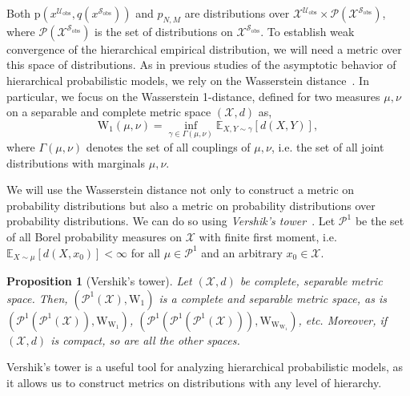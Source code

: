 \documentclass[12pt]{article}
\newtheorem{proposition}{Proposition}
\newcommand{\Sc}{\mathcal{S}}
\newcommand{\Uc}{\mathcal{U}}
\newcommand{\pr}{\mathrm{p}}
\newcommand{\obs}{\mathrm{obs}}
\newcommand{\Was}{\mathrm{W}}
\begin{document}
Both $\pr(x^{\Uc_\obs}, q(x^{\Sc_\obs}))$ and $p_{N,M}$ are distributions over $\mathcal{X}^{\Uc_\obs} \times \mathcal{P}(\mathcal{X}^{\Sc_\obs})$, where $\mathcal{P}(\mathcal{X}^{\Sc_\obs})$ is the set of distributions on $\mathcal{X}^{\Sc_\obs}$.
To establish weak convergence of the hierarchical empirical distribution, we will need a metric over this space of distributions.
As in previous studies of the asymptotic behavior of hierarchical probabilistic models, we rely on the Wasserstein distance~\citep{Nguyen2013-tv}.
In particular, we focus on the Wasserstein 1-distance, defined for two measures $\mu,\nu$ on a separable and complete metric space $(\mathcal{X},d)$ as,
\begin{equation*}
	\Was_{1}(\mu,\nu) = \inf_{\gamma \in \Gamma(\mu,\nu)} \mathbb{E}_{X, Y \sim \gamma}[d(X,Y)],
\end{equation*}
where $\Gamma(\mu,\nu)$ denotes the set of all couplings of $\mu,\nu$, i.e. the set of all joint distributions with marginals $\mu,\nu$.

We will use the Wasserstein distance not only to construct a metric on probability distributions but also a metric on probability distributions over probability distributions.
We can do so using \textit{Vershik's tower}~\citep[Chap. 1.1]{Bogachev2012-dz}. Let $\mathcal{P}^1$ be the set of all Borel probability measures on $\mathcal{X}$ with finite first moment, i.e. $\mathbb{E}_{X \sim \mu}[d(X, x_0)] < \infty$ for all $\mu \in \mathcal{P}^1$ and an arbitrary $x_0 \in \mathcal{X}$. 
\begin{proposition}[Vershik's tower]
	Let $(\mathcal{X}, d)$ be complete, separable metric space. Then, $(\mathcal{P}^1(\mathcal{X}), \Was_{1})$ is a complete and separable metric space, as is $(\mathcal{P}^1(\mathcal{P}^1(\mathcal{X})), \Was_{\Was_{1}})$,
	$(\mathcal{P}^1(\mathcal{P}^1(\mathcal{P}^1(\mathcal{X}))), \Was_{\Was_{\Was_{1}}})$, etc.  Moreover, if $(\mathcal{X}, d)$ is compact, so are all the other spaces.
\end{proposition}
\noindent Vershik's tower is a useful tool for analyzing hierarchical probabilistic models, as it allows us to construct metrics on distributions with any level of hierarchy.
\end{document}
